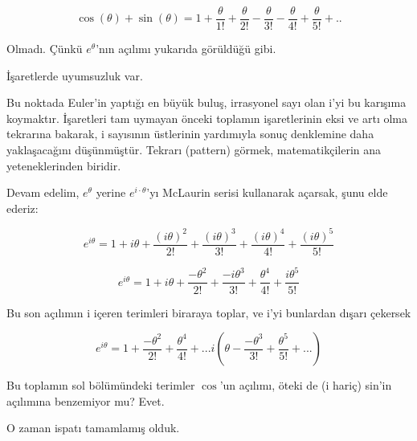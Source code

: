 \documentclass[12pt,fleqn]{article}\usepackage{../../common}
\begin{document}
$$ \cos(\theta) + \sin(\theta) = 1+ \frac{\theta}{1!} + \frac{\theta}{2!} -
\frac{\theta}{3!} - \frac{\theta}{4!} + \frac{\theta}{5!} + ..$$

Olmadı. Çünkü $e^\theta$'nın açılımı yukarıda görüldüğü gibi. 

İşaretlerde uyumsuzluk var.

Bu noktada Euler'in yaptığı en büyük buluş, irrasyonel sayı olan i'yi bu
karışıma koymaktır. İşaretleri tam uymayan önceki toplamın işaretlerinin
eksi ve artı olma tekrarına bakarak, i sayısının üstlerinin yardımıyla
sonuç denklemine daha yaklaşacağını düşünmüştür. Tekrarı (pattern) görmek,
matematikçilerin ana yeteneklerinden biridir.

Devam edelim, $e^\theta$ yerine $e^{i \cdot \theta}$'yı McLaurin serisi
kullanarak açarsak, şunu elde ederiz:

$$ e^{i\theta} = 1 + i\theta + \frac{(i\theta)^2}{2!} +
\frac{(i\theta)^3}{3!} + \frac{(i\theta)^4}{4!} + \frac{(i\theta)^5}{5!}     $$

$$ e^{i\theta} = 1 + i\theta + \frac{-\theta^2}{2!} +
\frac{-i\theta^3}{3!} + \frac{\theta^4}{4!} + \frac{i\theta^5}{5!}     $$

Bu son açılımın i içeren terimleri biraraya toplar, ve i'yi bunlardan
dışarı çekersek

$$ 
e^{i\theta} = 1 + \frac{-\theta^2}{2!} + \frac{\theta^4}{4!} + ...
i (\theta - \frac{-\theta^3}{3!} +  \frac{\theta^5}{5!} + ... ) 
$$

Bu toplamın sol bölümündeki terimler $\cos$'un açılımı, öteki de (i hariç)
sin'in açılımına benzemiyor mu? Evet.

O zaman ispatı tamamlamış olduk. 
\end{document}
